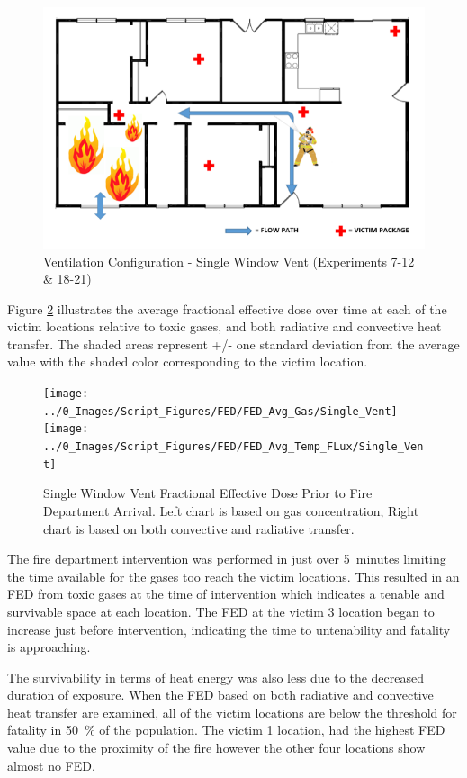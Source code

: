 \documentclass[12pt,oneside]{book}
\begin{document}
\begin{figure}[H]
	\centering
	\includegraphics[width=.65\textwidth]{../0_Images/Ventilation_Configurations/Single_Vent.png}
	\caption{Ventilation Configuration - Single Window Vent (Experiments 7-12 \& 18-21)}
	\label{fig:Vent_Profile-Single_Vent}
\end{figure}

Figure \ref{fig:FED_SingleVent} illustrates the average fractional effective dose over time at each of the victim locations relative to toxic gases, and both radiative and convective heat transfer. The shaded areas represent +/- one standard deviation from the average value with the shaded color corresponding to the victim location. 

\begin{figure}[H]
	\centering
	\texttt{[image: ../0\_Images/Script\_Figures/FED/FED\_Avg\_Gas/Single\_Vent]}
	\texttt{[image: ../0\_Images/Script\_Figures/FED/FED\_Avg\_Temp\_FLux/Single\_Vent]}
	\caption[Single Window Vent Fractional Effective Dose]{Single Window Vent Fractional Effective Dose Prior to Fire Department Arrival. Left chart is based on gas concentration, Right chart is based on both convective and radiative transfer.}
	\label{fig:FED_SingleVent}
\end{figure}

The fire department intervention was performed in just over 5~minutes limiting the time available for the gases too reach the victim locations. This resulted in an FED from toxic gases at the time of intervention which indicates a tenable and survivable space at each location. The FED at the victim 3 location began to increase just before intervention, indicating the time to untenability and fatality is approaching. 

The survivability in terms of heat energy was also less due to the decreased duration of exposure. When the FED based on both radiative and convective heat transfer are examined, all of the victim locations are below the threshold for fatality in 50~\% of the population. The victim 1 location, had the highest FED value due to the proximity of the fire however the other four locations show almost no FED. 
\end{document}
